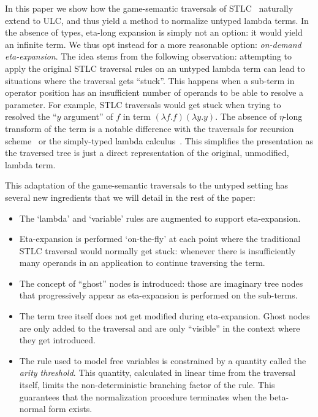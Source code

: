 \documentclass{article}
\theoremstyle{definition}
\begin{document}
In this paper we show how the game-semantic traversals of STLC~\cite{BlumPhd} naturally extend to ULC, and thus yield a method to normalize untyped lambda terms. In the absence of types, eta-long expansion is simply not an option: it would yield an infinite term. We thus opt instead for a more reasonable option: \emph{on-demand eta-expansion}. The idea stems from the following observation: attempting to apply the original STLC traversal rules on an untyped lambda term can lead to situations where the traversal gets ``stuck''. This happens when a sub-term in operator position has an insufficient number of operands to be able to resolve a parameter. For example, STLC traversals would get stuck when trying to resolved the ``$y$ argument'' of $f$ in term $(\lambda f.f)(\lambda y.y)$. The absence of $\eta$-long transform of the term is a notable difference with the traversals for recursion scheme~\cite{Ong2006} or the simply-typed lambda calculus~\cite{BlumPhd}. This simplifies the presentation as the traversed tree is just a direct representation of the original, unmodified, lambda term.

This adaptation of the game-semantic traversals to the untyped setting has several new ingredients that we will detail in the rest of the paper:
\begin{itemize}
\item  The `lambda' and `variable' rules are augmented to support eta-expansion.
 \item Eta-expansion is performed `on-the-fly' at each point where the traditional STLC traversal would normally get stuck: whenever there is insufficiently many operands in an application to continue traversing the term.
\item The concept of ``ghost'' nodes is introduced: those are imaginary tree nodes that progressively appear as eta-expansion is performed on the sub-terms.
\item The term tree itself does not get modified during eta-expansion. Ghost nodes are only added to the traversal and are only ``visible'' in the context where they get introduced.
\item The rule used to model free variables is constrained by a quantity called the \emph{arity threshold}. This quantity, calculated in linear time from the traversal itself, limits the non-deterministic branching factor of the rule. This guarantees that the normalization procedure terminates when the beta-normal form exists.
\end{itemize}
\end{document}
